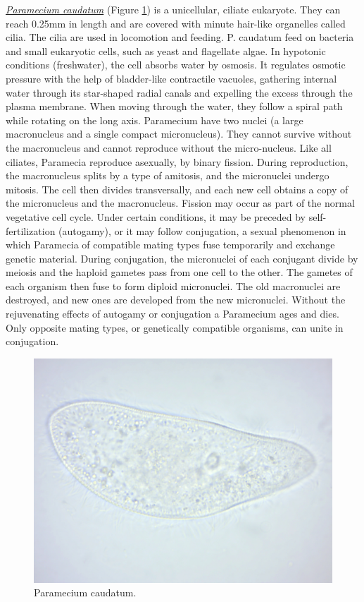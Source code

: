 \href{https://en.wikipedia.org/wiki/Paramecium_caudatum}{\emph{Paramecium
caudatum}} (Figure \ref{fig:paramecium}) is a unicellular, ciliate
eukaryote. They can reach 0.25mm in length and are covered with minute
hair-like organelles called cilia. The cilia are used in locomotion and
feeding. P. caudatum feed on bacteria and small eukaryotic cells, such
as yeast and flagellate algae. In hypotonic conditions (freshwater), the
cell absorbs water by osmosis. It regulates osmotic pressure with the
help of bladder-like contractile vacuoles, gathering internal water
through its star-shaped radial canals and expelling the excess through
the plasma membrane. When moving through the water, they follow a spiral
path while rotating on the long axis. Paramecium have two nuclei (a
large macronucleus and a single compact micronucleus). They cannot
survive without the macronucleus and cannot reproduce without the
micro-nucleus. Like all ciliates, Paramecia reproduce asexually, by
binary fission. During reproduction, the macronucleus splits by a type
of amitosis, and the micronuclei undergo mitosis. The cell then divides
transversally, and each new cell obtains a copy of the micronucleus and
the macronucleus. Fission may occur as part of the normal vegetative
cell cycle. Under certain conditions, it may be preceded by
self-fertilization (autogamy), or it may follow conjugation, a sexual
phenomenon in which Paramecia of compatible mating types fuse
temporarily and exchange genetic material. During conjugation, the
micronuclei of each conjugant divide by meiosis and the haploid gametes
pass from one cell to the other. The gametes of each organism then fuse
to form diploid micronuclei. The old macronuclei are destroyed, and new
ones are developed from the new micronuclei. Without the rejuvenating
effects of autogamy or conjugation a Paramecium ages and dies. Only
opposite mating types, or genetically compatible organisms, can unite in
conjugation.

\begin{figure}

{\centering \includegraphics[width=0.7\linewidth]{./figures/protists/Paramecium_caudatum} 

}

\caption{Paramecium caudatum.}\label{fig:paramecium}
\end{figure}

